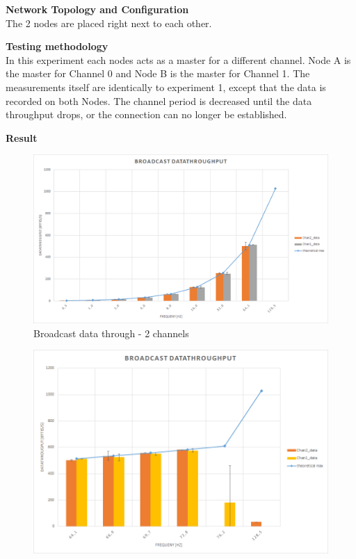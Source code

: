 \begin{description}
	\item{\textbf{Network Topology and Configuration}} \hfill \\ The 2 nodes are placed right next to each other.
	\item{\textbf{Testing methodology}} \hfill \\ In this experiment each nodes acts as a master for a different channel. Node A is the master for Channel 0 and Node B is the master for Channel 1. The measurements itself are identically to experiment 1, except that the data is recorded on both Nodes. The channel period is decreased until the data throughput drops, or the connection can no longer be established.
	\item{\textbf{Result}} \hfill \\  	
	\begin{figure}[H]
		\centering
		\includegraphics[scale=0.5]{./pics/exp2_norm.png}
		\caption{Broadcast data through - 2 channels}\label{fig:exp2low}
	\end{figure}
	\begin{figure}[H]
		\centering
		\includegraphics[scale=0.5]{./pics/exp2_detail.png}

\end{figure}
\end{description}
